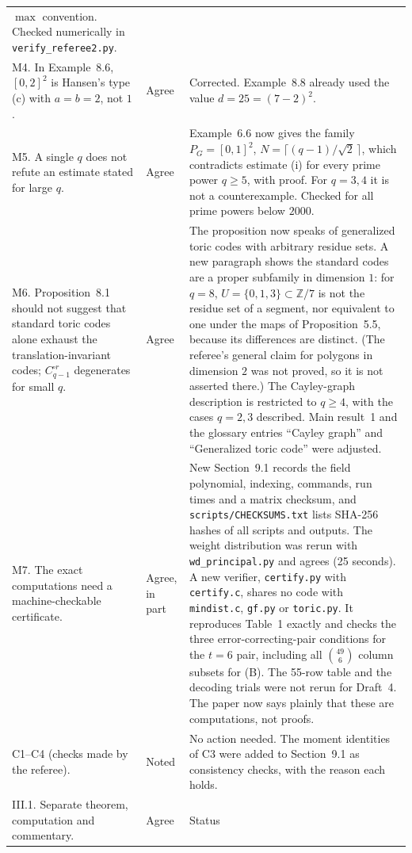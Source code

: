 \documentclass[12pt,letterpaper]{article}
\newcommand{\Z}{\mathbb{Z}}
\begin{document}
\begin{longtable}{@{}L{0.22\textwidth}L{0.12\textwidth}L{0.58\textwidth}@{}}
$\max$ convention. Checked numerically in \texttt{verify\_referee2.py}.\\
M4. In Example~8.6, $[0,2]^2$ is Hansen's type (c) with $a=b=2$, not $1$. &
Agree & Corrected. Example~8.8 already used the value $d=25=(7-2)^2$.\\
M5. A single $q$ does not refute an estimate stated for large $q$. & Agree &
Example~6.6 now gives the family $P_G=[0,1]^2$,
$N=\lceil(q-1)/\sqrt2\,\rceil$, which contradicts estimate (i) for every
prime power $q\ge5$, with proof. For $q=3,4$ it is not a counterexample.
Checked for all prime powers below $2000$.\\
M6. Proposition~8.1 should not suggest that standard toric codes alone
exhaust the translation-invariant codes; $C_{q-1}^{\square r}$ degenerates
for small $q$. & Agree & The proposition now speaks of generalized toric codes
with arbitrary residue sets. A new paragraph shows the standard codes are a
proper subfamily in dimension $1$: for $q=8$, $U=\{0,1,3\}\subset\Z/7$ is not
the residue set of a segment, nor equivalent to one under the maps of
Proposition~5.5, because its differences are distinct. (The referee's general
claim for polygons in dimension $2$ was not proved, so it is not asserted
there.) The Cayley-graph description is restricted to $q\ge4$, with the cases
$q=2,3$ described. Main result~1 and the glossary entries ``Cayley graph''
and ``Generalized toric code'' were adjusted.\\
M7. The exact computations need a machine-checkable certificate. & Agree,
in part & New Section~9.1 records the field polynomial, indexing, commands,
run times and a matrix checksum, and \texttt{scripts/CHECKSUMS.txt} lists
SHA-256 hashes of all scripts and outputs. The weight distribution was rerun
with \texttt{wd\_principal.py} and agrees (25 seconds). A new verifier,
\texttt{certify.py} with \texttt{certify.c}, shares no code with
\texttt{mindist.c}, \texttt{gf.py} or \texttt{toric.py}. It reproduces
Table~1 exactly and checks the three error-correcting-pair conditions for
the $t=6$ pair, including all $\binom{49}{6}$ column subsets for (B). The
55-row table and the decoding trials were not rerun for Draft~4. The paper
now says plainly that these are computations, not proofs.\\
C1--C4 (checks made by the referee). & Noted & No action needed. The moment
identities of C3 were added to Section~9.1 as consistency checks, with the
reason each holds.\\
III.1. Separate theorem, computation and commentary. & Agree & Status

\end{longtable}
\end{document}
